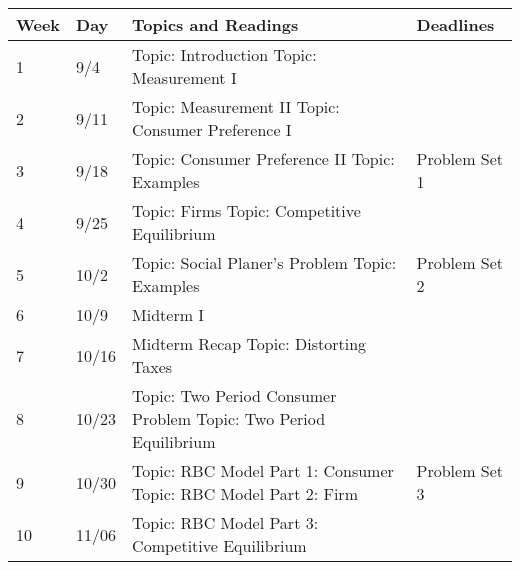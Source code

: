 \documentclass[12pt]{article}
\begin{document}
\newlength\bb
\setlength{}
\newlength\qq
\setlength{}
\newlength\rr
\setlength{}
\newlength\pp
\setlength{}
\begin{tabular}{|p{\bb}|p{\bb}|p{\pp}|p{\rr}|}
    \hline
        Week & Day & Topics and Readings & Deadlines \\
    \hline
    \hline
        1
        &
        9/4
        &
        Topic: Introduction
        \newline
        Topic: Measurement I
        &
    \\
    \hline
        2
        &
        9/11
        &
        Topic: Measurement II
        \newline
        Topic: Consumer Preference I
        &
    \\
    \hline
        3
        &
        9/18
        &
        Topic: Consumer Preference II
        \newline
        Topic: Examples
        &
        Problem Set 1
    \\
    \hline
        4
        &
        9/25
        &
        Topic: Firms
        \newline
        Topic: Competitive Equilibrium
        &
    \\
    \hline
        5
        &
        10/2
        &
        Topic: Social Planer's Problem
        \newline
        Topic: Examples
        &
        Problem Set 2
    \\
    \hline
        6
        &
        10/9
        &
        Midterm I
        &
    \\
    \hline
        7
        &
        10/16
        &
        Midterm Recap
        \newline
        Topic: Distorting Taxes
        &
    \\
    \hline
        8
        &
        10/23
        &
        Topic: Two Period Consumer Problem
        \newline
        Topic: Two Period Equilibrium
        &
    \\
    \hline
        9
        &
        10/30
        &
        Topic: RBC Model Part 1: Consumer
        \newline
        Topic: RBC Model Part 2: Firm
        &
        Problem Set 3
    \\
    \hline
        10
        &
        11/06
        &
        Topic: RBC Model Part 3: Competitive Equilibrium

\end{tabular}
\end{document}
